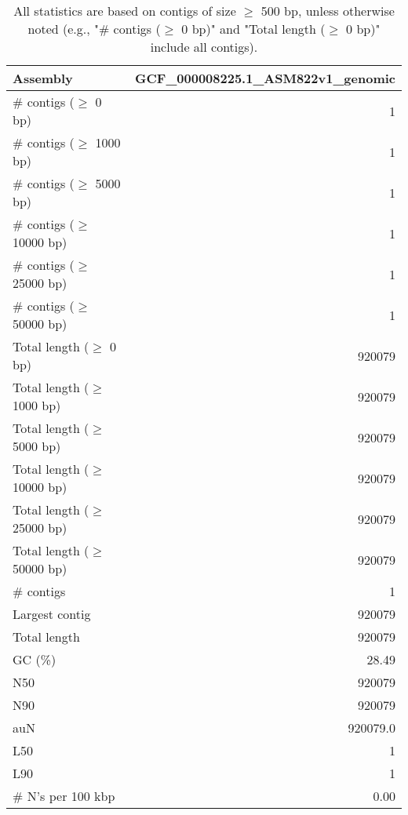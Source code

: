 \documentclass[12pt,a4paper]{article}
\begin{document}
\begin{table}[ht]
\begin{center}
\caption{All statistics are based on contigs of size $\geq$ 500 bp, unless otherwise noted (e.g., "\# contigs ($\geq$ 0 bp)" and "Total length ($\geq$ 0 bp)" include all contigs).}
\begin{tabular}{|l*{1}{|r}|}
\hline
Assembly & GCF\_000008225.1\_ASM822v1\_genomic \\ \hline
\# contigs ($\geq$ 0 bp) & 1 \\ \hline
\# contigs ($\geq$ 1000 bp) & 1 \\ \hline
\# contigs ($\geq$ 5000 bp) & 1 \\ \hline
\# contigs ($\geq$ 10000 bp) & 1 \\ \hline
\# contigs ($\geq$ 25000 bp) & 1 \\ \hline
\# contigs ($\geq$ 50000 bp) & 1 \\ \hline
Total length ($\geq$ 0 bp) & 920079 \\ \hline
Total length ($\geq$ 1000 bp) & 920079 \\ \hline
Total length ($\geq$ 5000 bp) & 920079 \\ \hline
Total length ($\geq$ 10000 bp) & 920079 \\ \hline
Total length ($\geq$ 25000 bp) & 920079 \\ \hline
Total length ($\geq$ 50000 bp) & 920079 \\ \hline
\# contigs & 1 \\ \hline
Largest contig & 920079 \\ \hline
Total length & 920079 \\ \hline
GC (\%) & 28.49 \\ \hline
N50 & 920079 \\ \hline
N90 & 920079 \\ \hline
auN & 920079.0 \\ \hline
L50 & 1 \\ \hline
L90 & 1 \\ \hline
\# N's per 100 kbp & 0.00 \\ \hline
\end{tabular}
\end{center}
\end{table}
\end{document}

